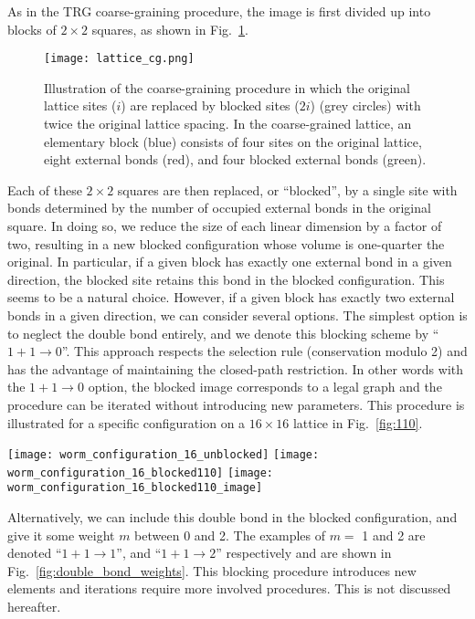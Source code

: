 \documentclass[../main.tex]{subfiles}
\begin{document}
As in the TRG coarse-graining procedure, the image is first divided up into
blocks of $2\times2$ squares, as shown in Fig.~\ref{fig:blocked-2}.
%
\begin{figure}[htpb]
    \centering
    \texttt{[image: lattice\_cg.png]}
    \caption{Illustration of the coarse-graining procedure in which the
      original lattice sites ($i$) are replaced by blocked sites ($2i$) (grey
      circles) with twice the original lattice spacing. In the coarse-grained
      lattice, an elementary block (blue) consists of four sites on the
      original lattice, eight external bonds (red), and four blocked external
      bonds (green).}%
\label{fig:blocked-2}
\end{figure}
%
Each of these $2\times2$ squares are then replaced, or ``blocked'', by a single
site with bonds determined by the number of occupied external bonds in the
original square.
%
In doing so, we reduce the size of each linear dimension by a factor of two,
resulting in a new blocked configuration whose volume is one-quarter the
original.
%
In particular, if a given block has exactly one external bond in a given
direction, the blocked site retains this bond in the blocked configuration.
%
This seems to be a natural choice.
%
However, if a given block has exactly two external bonds in a given direction,
we can consider several options. The simplest option is to neglect the double
bond entirely, and we denote this blocking scheme by ``$1+1\rightarrow 0$''.
%
This approach respects the selection rule (conservation modulo 2) and has the
advantage of maintaining the closed-path restriction.
%
In other words with the $1+1\rightarrow0$ option, the blocked image corresponds
to a legal graph and the procedure can be iterated without introducing new
parameters.
%
This procedure is illustrated for a specific configuration on a $16\times16$
lattice in Fig.~\ref{fig:110}.
%
\begin{figure*}[htpb]
    \centering
    \texttt{[image: worm\_configuration\_16\_unblocked]}\hfill%
    \texttt{[image: worm\_configuration\_16\_blocked110]}\hfill%
    \texttt{[image: worm\_configuration\_16\_blocked110\_image]}
    \caption{(a) Illustration of the $1+1\rightarrow 0$ blocking
        procedure discussed in the text: original configuration; (b)
        introduction of the blocks and replacement of single or double bounds
        according to the $1+1\rightarrow 0$ rule; (c) construction of the
    corresponding  blocked image.}%
\label{fig:110}
\end{figure*}
%
Alternatively, we can include this double bond in the blocked configuration,
and give it some weight $m$ between 0 and 2.
%
The examples of $m=$ 1 and 2 are denoted ``$1+1\rightarrow 1$'', and
``$1+1\rightarrow 2$'' respectively and are shown in
Fig.~\ref{fig:double_bond_weights}.
%
This blocking procedure introduces new elements and iterations require more
involved procedures.
%
This is not discussed hereafter. 
\end{document}
